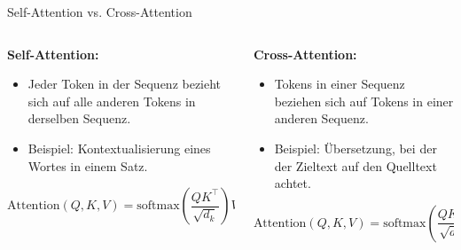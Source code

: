 \documentclass[aspectratio=1610, xcolor=dvipsnames, 9pt]{beamer}
\begin{document}
\begin{frame}{Self-Attention vs. Cross-Attention}
  \begin{columns}
    \begin{column}{0.5\textwidth}
      \textbf{Self-Attention:}
      \begin{itemize}
      \item Jeder Token in der Sequenz bezieht sich auf alle anderen Tokens in derselben Sequenz.
      \item Beispiel: Kontextualisierung eines Wortes in einem Satz.
      \end{itemize}
      \[
      \text{Attention}(Q, K, V) = \text{softmax}\left(\frac{QK^\top}{\sqrt{d_k}}\right)V, \quad Q = K = V
      \]
    \end{column}
    \begin{column}{0.5\textwidth}
      \textbf{Cross-Attention:}
      \begin{itemize}
      \item Tokens in einer Sequenz beziehen sich auf Tokens in einer anderen Sequenz.
      \item Beispiel: Übersetzung, bei der der Zieltext auf den Quelltext achtet.
      \end{itemize}
      \[
      \text{Attention}(Q, K, V) = \text{softmax}\left(\frac{QK^\top}{\sqrt{d_k}}\right)V, \quad Q \neq K = V
      \]
    \end{column}
    \end{columns}
\end{frame}
\end{document}

